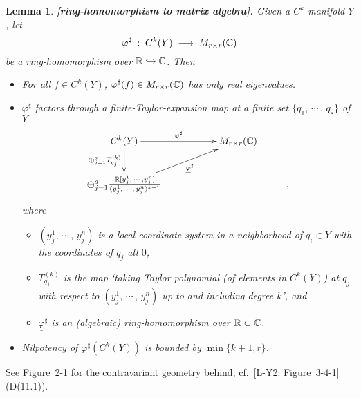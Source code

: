 \documentclass[11pt]{article}
\numberwithin{equation}{subsection}
\newtheorem{slemma}[stheorem]{Lemma}
\begin{document}
\begin{slemma}{\bf [ring-homomorphism to matrix algebra].}
  Given a $C^k$-manifold $Y$,
   let
     $$
	    \varphi^{\sharp}\; :\;  C^k(Y)\; \longrightarrow\;  M_{r\times r}({\Bbb C})
     $$
     be a ring-homomorphism over ${\Bbb R}\hookrightarrow{\Bbb C}$.
  Then
   \begin{itemize}
     \item[(1)]
	   For all $f\in C^k(Y)$, $\varphi^{\sharp}(f)\in M_{r\times r}({\Bbb C})$
	   has only real eigenvalues.
	
	 \item[(2)]
      $\varphi^{\sharp}$ factors through a finite-Taylor-expansion map
	  at a finite set $\{q_1,\,\cdots\,,\,q_s\}$ of $Y$
      $$
	    \xymatrix{
	     C^k(Y) \ar[rr]^-{\varphi^{\sharp}}
	           \ar[d]_-{\oplus_{j=1}^sT_{q_j}^{(k)} }
	       && M_{r\times r}({\Bbb C})    \\
         \oplus_{j=1}^s
	          \frac{{\Bbb R}[y_j^1,\,\cdots\,, y_j^n] }
	                   {(y_j^1,\,\cdots\,,\, y_j^n)^{k+1}}
	 	    	\ar[rru]_-{\underline{\varphi}^{\sharp}}    &&&,
	    }
       $$	
  	   where
	   \begin{itemize}
	    \item[$\cdot$]
		 $(y_j^1,\,\cdots\,,\, y_j^n)$ is a local coordinate system in a neighborhood of $q_i\in Y$
		   with the coordinates of $q_j$ all $0$,
		
		\item[$\cdot$]
		 $T_{q_j}^{(k)}$ is the map
		    `taking Taylor polynomial (of elements in $C^k(Y)$) at $q_j$
		      with respect to $(y_j^1,\,\cdots\,,\, y_j^n)$ up to and including degree $k$', and
			
	    \item[$\cdot$]		
		 $\underline{\varphi}^{\sharp}$ is an (algebraic) ring-homomorphism
		 over ${\Bbb R}\subset {\Bbb C}$.		
	   \end{itemize}
	 	
	 \item[(3)]
      Nilpotency of $\varphi^{\sharp}(C^k(Y))$ is bounded by 	$\min\{k+1, r\}$. 	
   \end{itemize}
\end{slemma}

\bigskip

\noindent
See {\sc Figure}~2-1 for the contravariant geometry behind;
cf.\ [L-Y2: {\sc Figure}~3-4-1] (D(11.1)).
%
\end{document}
